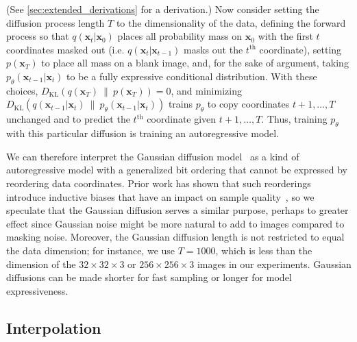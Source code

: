 (See \ref{sec:extended_derivations} for a derivation.) Now consider setting the diffusion process length $T$ to the dimensionality of the data, defining the forward process so that $q(\mathbf{x}_t|\mathbf{x}_0)$ places all probability mass on $\mathbf{x}_0$ with the first $t$ coordinates masked out (i.e. $q(\mathbf{x}_t|\mathbf{x}_{t-1})$ masks out the $t^\text{th}$ coordinate), setting $p(\mathbf{x}_T)$ to place all mass on a blank image, and, for the sake of argument, taking  $p_\theta(\mathbf{x}_{t-1}|\mathbf{x}_t)$ to be a fully expressive conditional distribution. With these choices, $D_{\mathrm{KL}}\!\left(q(\mathbf{x}_T) ~ \| ~ p(\mathbf{x}_T)\right)=0$, and minimizing $D_{\mathrm{KL}}\!\left(q(\mathbf{x}_{t-1}|\mathbf{x}_t) ~ \| ~ p_\theta(\mathbf{x}_{t-1}|\mathbf{x}_t)\right)$ trains $p_\theta$ to copy coordinates $t+1, \dotsc, T$ unchanged and to predict the $t^{\text{th}}$ coordinate given $t+1, \dotsc, T$. Thus, training $p_\theta$ with this particular diffusion is training an autoregressive model.

We can therefore interpret the Gaussian diffusion model~ as a kind of autoregressive model with a generalized bit ordering that cannot be expressed by reordering data coordinates. Prior work has shown that such reorderings introduce inductive biases that have an impact on sample quality~\citep{menick2018generating}, so we speculate that the Gaussian diffusion serves a similar purpose, perhaps to greater effect since Gaussian noise might be more natural to add to images compared to masking noise. Moreover, the Gaussian diffusion length is not restricted to equal the data dimension; for instance, we use $T=1000$, which is less than the dimension of the $32\times 32 \times 3$ or $256 \times 256 \times 3$ images in our experiments. Gaussian diffusions can be made shorter for fast sampling or longer for model expressiveness.

\subsection{Interpolation}

